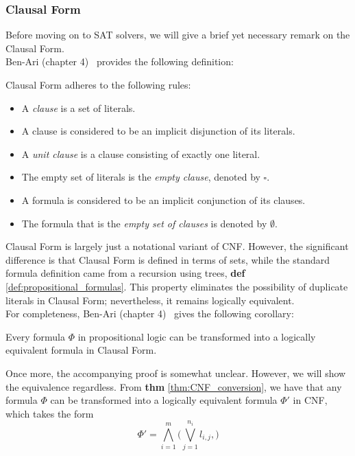 \subsubsection{Clausal Form}
Before moving on to SAT solvers, we will give a brief yet necessary remark on the Clausal Form.
\\
Ben-Ari (chapter 4)~\cite{Math-Logic-for-CompSci} provides the following definition:
\begin{definition}
    Clausal Form adheres to the following rules:
    \begin{itemize}
        \item A \emph{clause} is a set of literals.
        \item A clause is considered to be an implicit disjunction of its literals.
        \item A \emph{unit clause} is a clause consisting of exactly one literal.
        \item The empty set of literals is the \emph{empty clause}, denoted by \(\square\).
        \item A formula is considered to be an implicit conjunction of its clauses.
        \item The formula that is the \emph{empty set of clauses} is denoted by \(\emptyset\).
    \end{itemize}
\end{definition}
Clausal Form is largely just a notational variant of CNF. However, the significant difference is that Clausal Form is defined in terms of sets, while the standard formula definition came from a recursion using trees, \textbf{def} \ref{def:propositional_formulas}. This property eliminates the possibility of duplicate literals in Clausal Form; nevertheless, it remains logically equivalent.
\\
For completeness, Ben-Ari (chapter 4)~\cite{Math-Logic-for-CompSci} gives the following corollary:
\begin{corollary}
    Every formula \(\Phi\) in propositional logic can be transformed into a logically equivalent formula in Clausal Form.
\end{corollary}
Once more, the accompanying proof is somewhat unclear. However, we will show the equivalence regardless. From \textbf{thm} \ref{thm:CNF_conversion}, we have that any formula \(\Phi\) can be transformed into a logically equivalent formula \(\Phi'\) in CNF, which takes the form
\begin{equation*}
    \Phi' = \bigwedge_{i=1}^m \bigg(
        \bigvee_{j=1}^{n_i} l_{i,j},
    \bigg)
\end{equation*}
